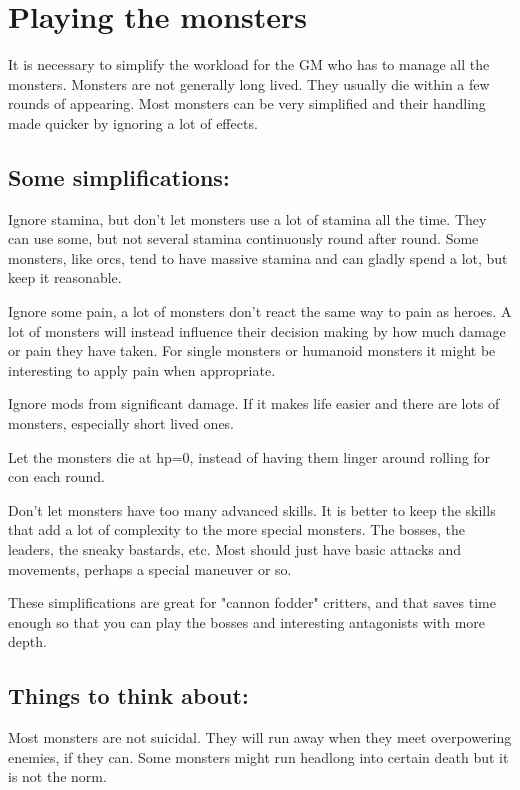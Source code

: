 \section*{Playing the monsters}

It is necessary to simplify the workload for the GM who has to manage all the monsters. Monsters are not generally long lived. They usually die within a few rounds of appearing. Most monsters can be very simplified and their handling made quicker by ignoring a lot of effects.


\subsection*{Some simplifications:}

Ignore stamina, but don't let monsters use a lot of stamina all the time. They can use some, but not several stamina continuously round after round. Some monsters, like orcs, tend to have massive stamina and can gladly spend a lot, but keep it reasonable.

Ignore some pain, a lot of monsters don't react the same way to pain as heroes. A lot of monsters will instead influence their decision making by how much damage or pain they have taken. For single monsters or humanoid monsters it might be interesting to apply pain when appropriate.

Ignore mods from significant damage. If it makes life easier and there are lots of monsters, especially short lived ones.

Let the monsters die at hp=0, instead of having them linger around rolling for con each round.

Don't let monsters have too many advanced skills. It is better to keep the skills that add a lot of complexity to the more special monsters. The bosses, the leaders, the sneaky bastards, etc. Most should just have basic attacks and movements, perhaps a special maneuver or so.

These simplifications are great for "cannon fodder" critters, and that saves time enough so that you can play the bosses and interesting antagonists with more depth.


\subsection*{Things to think about:}

Most monsters are not suicidal. They will run away when they meet overpowering enemies, if they can. Some monsters might run headlong into certain death but it is not the norm.

